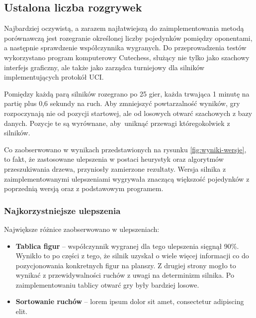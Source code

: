 \subsection{Ustalona liczba rozgrywek}
\label{subsec:ustalona-liczba-rozgrywek}

Najbardziej oczywistą, a zarazem najłatwiejszą do zaimplementowania metodą porównawczą jest rozegranie określonej liczby pojedynków pomiędzy oponentami, a następnie sprawdzenie współczynnika wygranych.
Do przeprowadzenia testów wykorzystano program komputerowy Cutechess, służący nie tylko jako szachowy interfejs graficzny, ale także jako zarządca turniejowy dla silników implementujących protokół UCI.

Pomiędzy każdą parą silników rozegrano po 25 gier, każda trwająca 1 minutę na partię plus 0,6 sekundy na ruch.
Aby zmniejszyć powtarzalność wyników, gry rozpoczynają nie od pozycji startowej, ale od losowych otwarć szachowych z bazy danych. \cite{lichess-book}
Pozycje te są wyrównane, aby~uniknąć przewagi któregokolwiek z silników.

Co zaobserwowano w wynikach przedstawionych na rysunku \ref{fig:wyniki-wersje}, to fakt, że zastosowane ulepszenia w postaci heurystyk oraz algorytmów przeszukiwania drzewa, przyniosły zamierzone rezultaty.
Wersja silnika z zaimplementowanymi ulepszeniami wygrywała znaczącą większość pojedynków z poprzednią wersją oraz z podstawowym programem.

\subsubsection{Najkorzystniejsze ulepszenia}

Największe różnice zaobserwowano w ulepszeniach:
\begin{itemize}
    \item \textbf{Tablica figur} – współczynnik wygranej dla tego ulepszenia sięgnął 90\%.
    Wynikło to po części z tego, że silnik uzyskał o wiele więcej informacji co do pozycjonowania konkretnych figur na planszy.
    Z drugiej strony mogło to wynikać z przewidywalności ruchów z uwagi na determinizm silnika.
    Po zaimplementowaniu tablicy otwarć gry były bardziej losowe.
    \item \textbf{Sortowanie ruchów} – lorem ipsum dolor sit amet, consectetur adipiscing elit.
\end{itemize}

